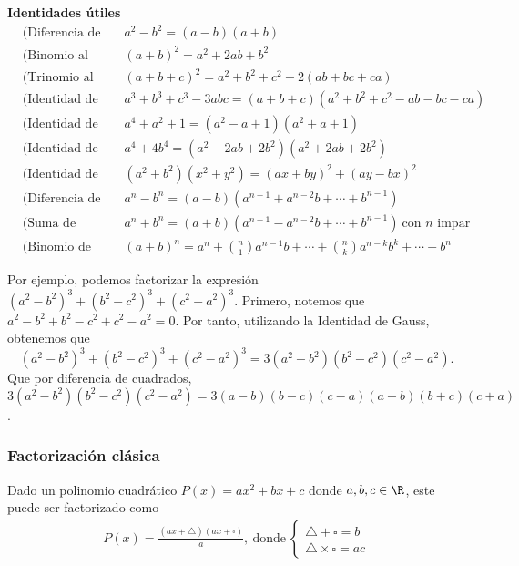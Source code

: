 \textbf{Identidades útiles}
\begin{align*}
    &\text{(Diferencia de cuadrados)}     && a^2 - b^2 = (a - b)(a + b)\\[2mm]
    &\text{(Binomio al cuadrado)}         && (a + b)^2 = a^2 + 2ab + b^2\\[2mm]
    &\text{(Trinomio al cuadrado)}        && (a + b + c)^2 = a^2 + b^2 + c^2 + 2(ab + bc + ca)\\[2mm]
    &\text{(Identidad de Gauss)}          && a^3 + b^3 + c^3 - 3abc = (a + b + c)(a^2 + b^2 + c^2 - ab - bc - ca)\\[2mm]
    &\text{(Identidad de Argand)}         && a^4 + a^2 + 1 = (a^2 - a + 1)(a^2 + a + 1)\\[2mm]
    &\text{(Identidad de Sophie Germain)} && a^4 + 4 b^4 = (a^2 - 2ab + 2b^2)\left(a^2 + 2ab + 2b^2\right)\\[2mm]
    &\text{(Identidad de Brahmagupta)}    && (a^2 + b^2) (x^2 + y^2) = (ax + by)^2 + (ay - bx)^2\\[2mm]
    &\text{(Diferencia de potencias)}     && a^n - b^n = (a - b)(a^{n - 1} + a^{n - 2}b + \cdots + b^{n - 1})\\[2mm]
    &\text{(Suma de potencias)}           && a^n + b^n = (a + b)(a^{n - 1} - a^{n - 2}b + \cdots + b^{n - 1}) \ \text{con $n$ impar}\\[1.5mm]
    &\text{(Binomio de Newton)}           && (a + b)^n = a^n + \binom{n}{1} a^{n - 1}b + \cdots + \binom{n}{k} a^{n -k}b^k + \cdots + b^n
\end{align*}

Por ejemplo, podemos factorizar la expresión $(a^2 - b^2)^3 + (b^2 - c^2)^3 + (c^2 - a^2)^3$.
Primero, notemos que $a^2 - b^2 + b^2 - c^2 + c^2 - a^2 = 0$.
Por tanto, utilizando la Identidad de Gauss, obtenemos que
\[
    (a^2 - b^2)^3 + (b^2 - c^2)^3 + (c^2 - a^2)^3 = 3 (a^2 - b^2)(b^2 - c^2)(c^2 - a^2).
\]
Que por diferencia de cuadrados, $3 (a^2 - b^2)(b^2 - c^2)(c^2 - a^2) = 3 (a - b)(b - c)(c - a) (a + b)(b + c)(c + a)$.



\subsubsection{Factorización clásica}

Dado un polinomio cuadrático $P(x) = ax^2 + bx + c$ donde $a, b, c \in \R$, este puede ser factorizado como
\begin{gather*}
    P(x) = \frac{(ax + \triangle)(ax + \square)}{a},\ \text{donde}\
    \begin{cases}
        \triangle + \square = b\\
        \triangle \times \square = ac
    \end{cases}
\end{gather*}

